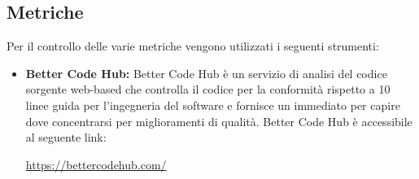 \documentclass[openany,12pt,a4paper]{report}
\begin{document}
\subsection{Metriche}
Per il controllo delle varie metriche vengono utilizzati i seguenti strumenti:
\begin{itemize}
\item \textbf{Better Code Hub:} Better Code Hub è un servizio di analisi del codice sorgente web-based che controlla il codice per la conformità rispetto a 10 linee guida per l'ingegneria del software e fornisce un  immediato per capire dove concentrarsi per miglioramenti di qualità. Better Code Hub è accessibile al seguente link:\\ \centerline{\url{https://bettercodehub.com/}}
\end{itemize}
\end{document}
